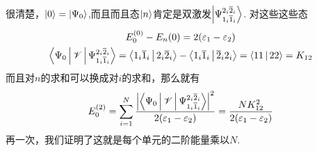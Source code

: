 很清楚，$\Ket{0}=\Ket{\Psi_0}$,而且而且态$\Ket{n}$肯定是双激发$\Ket{\Psi_{1_i\overline{1}_i}^{2_i\overline{2}_i}}$. 对这些这些态
\begin{subequations}
	\begin{gather}
	E_0^{(0)} - E_n{(0)} = 2(\varepsilon_1 - \varepsilon_2)
	\label{6.83a}\\
	\Braket{\Psi_0|\mathscr{V}|\Psi_{1_i\overline{1}_i}^{2_i\overline{2}_i}} = \Braket{1_i\overline{1}_i | 2_i\overline{2}_i} - \Braket{1_i\overline{1}_i|\overline{2}_i2_i} = \Braket{11|22}=K_{12}
	\label{6.83b}
\end{gather}
\end{subequations}
而且对$n$的求和可以换成对$i$的求和，那么就有
\begin{align}
E_0^{(2)} = \sum_{i=1}^{N} \frac{\left|\Braket{\Psi_0|\mathscr{V}|\Psi_{1_i\overline{1}_i}^{2_i\overline{2}_i}}\right|^2}{2(\varepsilon_1-\varepsilon_2)} = \frac{NK_{12}^2}{2(\varepsilon_1-\varepsilon_2)}
\end{align}
再一次，我们证明了这就是每个单元的二阶能量乘以$N$.

